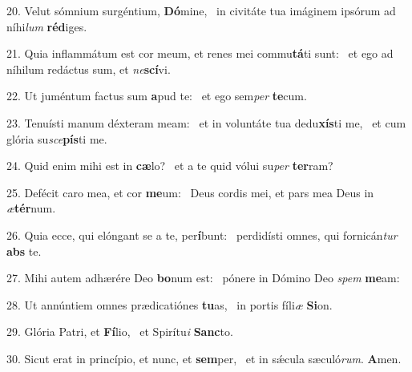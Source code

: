 20. Velut sómnium surgéntium, \textbf{Dó}mine, \ast\  in civitáte tua imáginem ipsórum ad níhi\textit{lum} \textbf{réd}iges.\

21. Quia inflammátum est cor meum, et renes mei commu\textbf{tá}ti sunt: \ast\  et ego ad níhilum redáctus sum, et \textit{ne}\textbf{scí}vi.\

22. Ut juméntum factus sum \textbf{a}pud te: \ast\  et ego sem\textit{per} \textbf{te}cum.\

23. Tenuísti manum déxteram meam: \dag\  et in voluntáte tua dedu\textbf{xís}ti me, \ast\  et cum glória su\textit{sce}\textbf{pís}ti me.\

24. Quid enim mihi est in \textbf{cæ}lo? \ast\  et a te quid vólui su\textit{per} \textbf{ter}ram?\

25. Defécit caro mea, et cor \textbf{me}um: \ast\  Deus cordis mei, et pars mea Deus in \textit{æ}\textbf{tér}num.\

26. Quia ecce, qui elóngant se a te, per\textbf{í}bunt: \ast\  perdidísti omnes, qui fornicán\textit{tur} \textbf{abs} te.\

27. Mihi autem adhærére Deo \textbf{bo}num est: \ast\  pónere in Dómino Deo \textit{spem} \textbf{me}am:\

28. Ut annúntiem omnes prædicatiónes \textbf{tu}as, \ast\  in portis fíli\textit{æ} \textbf{Si}on.\

29. Glória Patri, et \textbf{Fí}lio, \ast\  et Spirítu\textit{i} \textbf{Sanc}to.\

30. Sicut erat in princípio, et nunc, et \textbf{sem}per, \ast\  et in sǽcula sæculó\textit{rum}. \textbf{A}men.\

